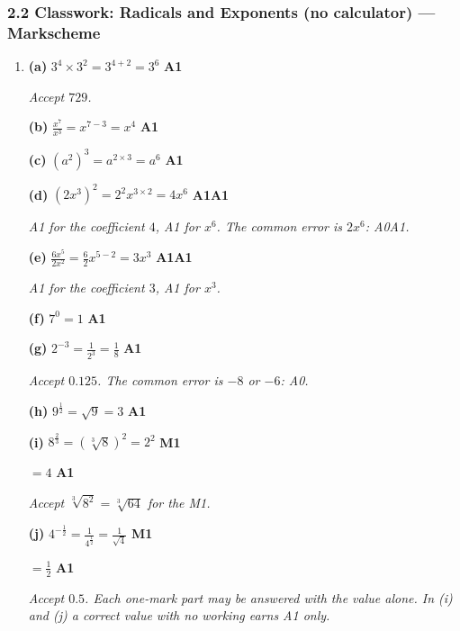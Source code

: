 \documentclass[12pt, twoside]{article}
\begin{document}
\subsubsection*{2.2 Classwork: Radicals and Exponents (no calculator) --- Markscheme}

\begin{enumerate}[itemsep=0.3cm]

\item[1.] [Maximum mark: 14]

\textbf{(a)} $3^{4} \times 3^{2} = 3^{4 + 2} = 3^{6}$ \hfill \textbf{A1}

\emph{Accept $729$.}

\textbf{(b)} $\frac{x^{7}}{x^{3}} = x^{7 - 3} = x^{4}$ \hfill \textbf{A1}

\textbf{(c)} $\left(a^{2}\right)^{3} = a^{2 \times 3} = a^{6}$ \hfill \textbf{A1}

\textbf{(d)} $\left(2x^{3}\right)^{2} = 2^{2} x^{3 \times 2} = 4x^{6}$ \hfill \textbf{A1A1}

\emph{A1 for the coefficient $4$, A1 for $x^{6}$. The common error is
$2x^{6}$: A0A1.}

\textbf{(e)} $\frac{6x^{5}}{2x^{2}} = \frac{6}{2} x^{5 - 2} = 3x^{3}$ \hfill \textbf{A1A1}

\emph{A1 for the coefficient $3$, A1 for $x^{3}$.}

\textbf{(f)} $7^{0} = 1$ \hfill \textbf{A1}

\textbf{(g)} $2^{-3} = \frac{1}{2^{3}} = \frac{1}{8}$ \hfill \textbf{A1}

\emph{Accept $0.125$. The common error is $-8$ or $-6$: A0.}

\textbf{(h)} $9^{\frac{1}{2}} = \sqrt{9} = 3$ \hfill \textbf{A1}

\textbf{(i)} $8^{\frac{2}{3}} = \left(\sqrt[3]{8}\right)^{2} = 2^{2}$ \hfill \textbf{M1}

$= 4$ \hfill \textbf{A1}

\emph{Accept $\sqrt[3]{8^{2}} = \sqrt[3]{64}$ for the M1.}

\textbf{(j)} $4^{-\frac{1}{2}} = \frac{1}{4^{\frac{1}{2}}} = \frac{1}{\sqrt{4}}$ \hfill \textbf{M1}

$= \frac{1}{2}$ \hfill \textbf{A1}

\emph{Accept $0.5$. Each one-mark part may be answered with the value alone.
In (i) and (j) a correct value with no working earns A1 only.}


\end{enumerate}
\end{document}
